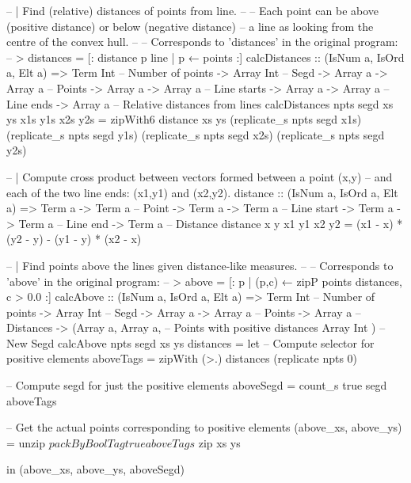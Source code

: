 \documentclass[preamble.tex]{subfiles}
\begin{document}
\clearpage
\begin{hscode}
-- | Find (relative) distances of points from line.
--
-- Each point can be above (positive distance) or below (negative distance)
-- a line as looking from the centre of the convex hull.
--
-- Corresponds to 'distances' in the original program:
-- > distances = [: distance p line | p ← points :]
calcDistances :: (IsNum a, IsOrd a, Elt a)
              => Term Int            -- Number of points
              -> Array Int           -- Segd
              -> Array a -> Array a  -- Points
              -> Array a -> Array a  -- Line starts
              -> Array a -> Array a  -- Line ends
              -> Array a             -- Relative distances from lines
calcDistances npts segd xs ys x1s y1s x2s y2s
  = zipWith6 distance xs
                      ys
                      (replicate_s npts segd x1s)
                      (replicate_s npts segd y1s)
                      (replicate_s npts segd x2s)
                      (replicate_s npts segd y2s)



-- | Compute cross product between vectors formed between a point (x,y)
--   and each of the two line ends: (x1,y1) and (x2,y2).
distance :: (IsNum a, IsOrd a, Elt a)
         => Term a -> Term a  -- Point
         -> Term a -> Term a  -- Line start
         -> Term a -> Term a  -- Line end
         -> Term a            -- Distance
distance x y x1 y1 x2 y2
  = (x1 - x) * (y2 - y) - (y1 - y) * (x2 - x)

\end{hscode}


\clearpage
\begin{hscode}
-- | Find points above the lines given distance-like measures.
--
-- Corresponds to 'above' in the original program:
-- > above = [: p | (p,c) ← zipP points distances, c > 0.0 :]
calcAbove :: (IsNum a, IsOrd a, Elt a)
          => Term Int            -- Number of points
          -> Array Int           -- Segd
          -> Array a -> Array a  -- Points
          -> Array a             -- Distances
          -> (Array a, Array a,  -- Points with positive distances
              Array Int       )  -- New Segd
calcAbove npts segd xs ys distances
  = let -- Compute selector for positive elements
        aboveTags  = zipWith (>.) distances (replicate npts 0)

        -- Compute segd for just the positive elements
        aboveSegd = count_s true segd aboveTags

        -- Get the actual points corresponding to positive elements
        (above_xs, above_ys)
                  = unzip
                  $ packByBoolTag true aboveTags
                  $ zip xs ys
 
    in  (above_xs, above_ys, aboveSegd)

\end{hscode}
\end{document}
